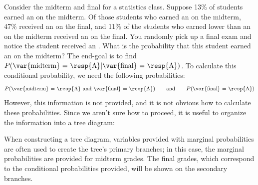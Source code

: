 \begin{examplewrap}
\begin{nexample}{Consider the midterm and final for a statistics class. Suppose 13\% of students earned an  on the midterm. Of those students who earned an  on the midterm, 47\% received an  on the final, and 11\% of the students who earned lower than an  on the midterm received an  on the final. You randomly pick up a final exam and notice the student received an . What is the probability that this student earned an  on the midterm?} \label{exerciseForTreeDiagramOfStudentGettingAOnMidtermGivenThatSheGotAOnFinal}
The end-goal is to find $P(\text{\var{midterm} = \resp{A}} | \text{\var{final} = \resp{A}})$. To calculate this conditional probability, we need the following probabilities:
\begin{align*}
P(\text{\var{midterm} = \resp{A} and \var{final} = \resp{A}})
  \qquad\text{and}\qquad
  P(\text{\var{final} = \resp{A}})
\end{align*}
However, this information is not provided, and it is not obvious how to calculate these probabilities. Since we aren't sure how to proceed, it is useful to organize the information into a tree diagram:
\begin{center}
\end{center}
When constructing a tree diagram, variables provided with marginal probabilities are often used to create the tree's primary branches; in this case, the marginal probabilities are provided for midterm grades. The final grades, which correspond to the conditional probabilities provided, will be shown on the secondary branches.


\end{nexample}
\end{examplewrap}
